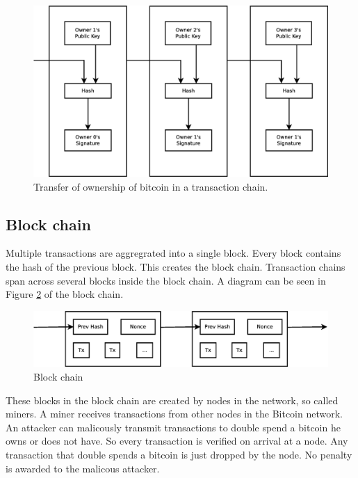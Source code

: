 \begin{figure}
	\centerline{\includegraphics[scale=0.3]{relatedWork/figs/transactions.eps}}
	\caption{Transfer of ownership of bitcoin in a transaction chain.}
	\label{fig:bt-transaction-chain}
\end{figure}

\subsection{Block chain}
Multiple transactions are aggregrated into a single block.
Every block contains the hash of the previous block.
This creates the block chain.
Transaction chains span across several blocks inside the block chain.
A diagram can be seen in Figure \ref{fig:bt-block-chain} of the block chain.


\begin{figure}
        \centerline{\includegraphics[scale=0.3]{relatedWork/figs/blocks.eps}}
        \caption{Block chain}
        \label{fig:bt-block-chain}
\end{figure}

These blocks in the block chain are created by nodes in the network, so called miners.
A miner receives transactions from other nodes in the Bitcoin network.
An attacker can malicously transmit transactions to double spend a bitcoin he owns or does not have.
So every transaction is verified on arrival at a node.
Any transaction that double spends a bitcoin is just dropped by the node.
No penalty is awarded to the malicous attacker.

